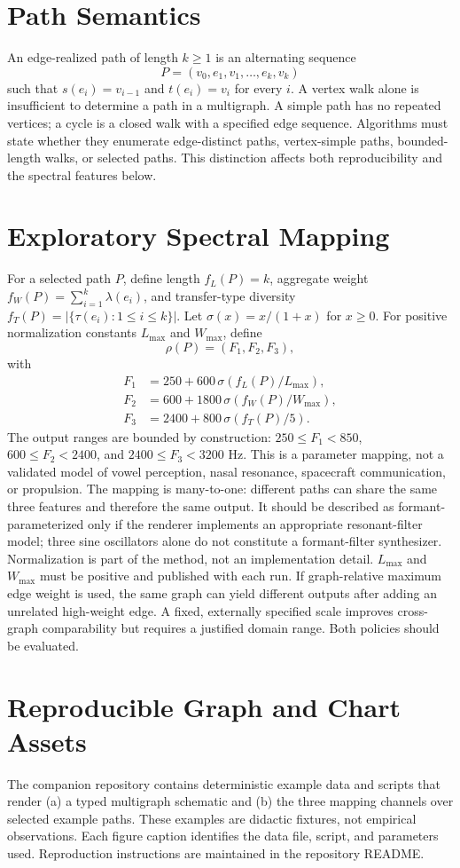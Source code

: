 \documentclass[11pt]{article}
\begin{document}
\section{Path Semantics}
An edge-realized path of length $k\geq1$ is an alternating sequence
\[
P=(v_0,e_1,v_1,\ldots,e_k,v_k)
\]
such that $s(e_i)=v_{i-1}$ and $t(e_i)=v_i$ for every $i$. A vertex walk alone is insufficient to determine a path in a multigraph. A simple path has no repeated vertices; a cycle is a closed walk with a specified edge sequence. Algorithms must state whether they enumerate edge-distinct paths, vertex-simple paths, bounded-length walks, or selected paths. This distinction affects both reproducibility and the spectral features below.
\section{Exploratory Spectral Mapping}
For a selected path $P$, define length $f_L(P)=k$, aggregate weight $f_W(P)=\sum_{i=1}^k\lambda(e_i)$, and transfer-type diversity $f_T(P)=|\{\tau(e_i):1\leq i\leq k\}|$. Let $\sigma(x)=x/(1+x)$ for $x\geq0$. For positive normalization constants $L_{\max}$ and $W_{\max}$, define
\[
\rho(P)=(F_1,F_2,F_3),
\]
with
\begin{align*}
F_1&=250+600\,\sigma(f_L(P)/L_{\max}),\\
F_2&=600+1800\,\sigma(f_W(P)/W_{\max}),\\
F_3&=2400+800\,\sigma(f_T(P)/5).
\end{align*}
The output ranges are bounded by construction: $250\leq F_1<850$, $600\leq F_2<2400$, and $2400\leq F_3<3200$ Hz. This is a parameter mapping, not a validated model of vowel perception, nasal resonance, spacecraft communication, or propulsion. The mapping is many-to-one: different paths can share the same three features and therefore the same output. It should be described as formant-parameterized only if the renderer implements an appropriate resonant-filter model; three sine oscillators alone do not constitute a formant-filter synthesizer.
Normalization is part of the method, not an implementation detail. $L_{\max}$ and $W_{\max}$ must be positive and published with each run. If graph-relative maximum edge weight is used, the same graph can yield different outputs after adding an unrelated high-weight edge. A fixed, externally specified scale improves cross-graph comparability but requires a justified domain range. Both policies should be evaluated.
\section{Reproducible Graph and Chart Assets}
The companion repository contains deterministic example data and scripts that render (a) a typed multigraph schematic and (b) the three mapping channels over selected example paths. These examples are didactic fixtures, not empirical observations. Each figure caption identifies the data file, script, and parameters used. Reproduction instructions are maintained in the repository README.
\end{document}
